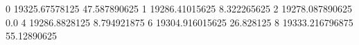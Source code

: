 0 19325.67578125 47.587890625
1 19286.41015625 8.322265625
2 19278.087890625 0.0
4 19286.8828125 8.794921875
6 19304.916015625 26.828125
8 19333.216796875 55.12890625

